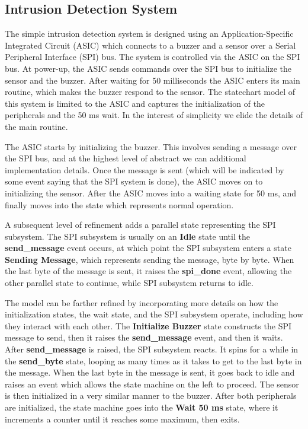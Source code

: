 

\subsection{Intrusion Detection System}
\label{sec:secbot}


The simple intrusion detection system is designed using an Application-Specific Integrated Circuit (ASIC) which connects to a buzzer and a sensor over a Serial Peripheral Interface (SPI) bus. The system is controlled via the ASIC on the SPI bus. At power-up, the ASIC sends commands over the SPI bus to initialize the sensor and the buzzer. After waiting for 50 milliseconds the ASIC enters its main routine, which makes the buzzer respond to the sensor. The statechart model of this system is limited to the ASIC and captures the initialization of the peripherals and the 50 ms wait. In the interest of simplicity we elide the details of the main routine.

The ASIC starts by initializing the buzzer. This involves sending a message over the SPI bus, and at the highest level of abstract we can additional implementation details. Once the message is sent (which will be indicated by some event saying that the SPI system is done), the ASIC moves on to initializing the sensor. After the ASIC moves into a waiting state for 50 ms, and finally moves into the state which represents normal operation.

A subsequent level of refinement adds a parallel state representing the SPI subsystem. The SPI subsystem is usually on an \textbf{Idle} state until the \textbf{send\_message} event occurs, at which point the SPI subsystem enters a state \textbf{Sending Message}, which represents sending the message, byte by byte. When the last byte of the message is sent, it raises the \textbf{spi\_done} event, allowing the other parallel state to continue, while SPI subsystem returns to idle.

The model can be farther refined by incorporating more details on how the initialization states, the wait state, and the SPI subsystem operate, including how they interact with each other. The \textbf{Initialize Buzzer} state constructs the SPI message to send, then it raises the \textbf{send\_message} event, and then it waits.
After \textbf{send\_message} is raised, the SPI subsystem reacts. It spins for a while in the \textbf{send\_byte} state, looping as many times as it takes to get to the last byte in the message. When the last byte in the message is sent, it goes back to idle and raises an event which allows the state machine on the left to proceed. The sensor is then initialized in a very similar manner to the buzzer. After both peripherals are initialized, the state machine goes into the \textbf{Wait 50 ms} state, where it  increments a counter until it reaches some maximum, then exits.


